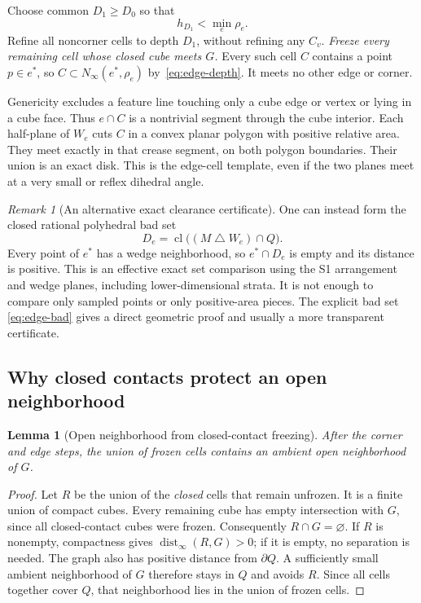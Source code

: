\documentclass[11pt]{article}
\newtheorem{lemma}[theorem]{Lemma}
\theoremstyle{definition}
\theoremstyle{remark}
\newtheorem{remark}[theorem]{Remark}
\newcommand{\cl}{\operatorname{cl}}
\newcommand{\dist}{\operatorname{dist}}
\newcommand{\Ninf}[2]{N_\infty(#1,#2)}
\newcommand{\symdiff}{\mathbin{\triangle}}
\begin{document}
Choose common $D_1\ge D_0$ so that
\[
  h_{D_1}<\min_e\rho_e. \tag{8}\label{eq:edge-depth}
\]
Refine all noncorner cells to depth $D_1$, without refining any $C_v$.
\emph{Freeze every remaining cell whose closed cube meets $G$.}
Every such cell $C$ contains a point $p\in e^*$, so
$C\subset\Ninf{e^*}{\rho_e}$ by~\eqref{eq:edge-depth}.
It meets no other edge or corner.

Genericity excludes a feature line touching only a cube edge or vertex
or lying in a cube face. Thus $e\cap C$ is a nontrivial segment through
the cube interior. Each half-plane of $W_e$ cuts $C$ in a convex planar
polygon with positive relative area. They meet exactly in that crease
segment, on both polygon boundaries. Their union is an exact disk.
This is the edge-cell template, even if the two planes meet at a very
small or reflex dihedral angle.

\begin{remark}[An alternative exact clearance certificate]
One can instead form the closed rational polyhedral bad set
\[
  D_e=\cl\bigl((M\symdiff W_e)\cap Q\bigr).
\]
Every point of $e^*$ has a wedge neighborhood, so $e^*\cap D_e$ is
empty and its distance is positive. This is an effective exact set
comparison using the S1 arrangement and wedge planes, including
lower-dimensional strata. It is not enough to compare only sampled
points or only positive-area pieces. The explicit bad set
\eqref{eq:edge-bad} gives a direct geometric proof and usually a more
transparent certificate.
\end{remark}

\subsection{Why closed contacts protect an open neighborhood}
\label{sec:open-neighborhood}

\begin{lemma}[Open neighborhood from closed-contact freezing]
\label{lem:open-neighborhood}
After the corner and edge steps, the union of frozen cells contains an
ambient open neighborhood of $G$.
\end{lemma}

\begin{proof}
Let $R$ be the union of the \emph{closed} cells that remain unfrozen.
It is a finite union of compact cubes. Every remaining cube has empty
intersection with $G$, since all closed-contact cubes were frozen.
Consequently $R\cap G=\varnothing$. If $R$ is nonempty, compactness
gives $\dist_\infty(R,G)>0$; if it is empty, no separation is needed.
The graph also has positive distance from $\partial Q$. A sufficiently
small ambient neighborhood of $G$ therefore stays in $Q$ and avoids
$R$. Since all cells together cover $Q$, that neighborhood lies in the
union of frozen cells.
\end{proof}
\end{document}
